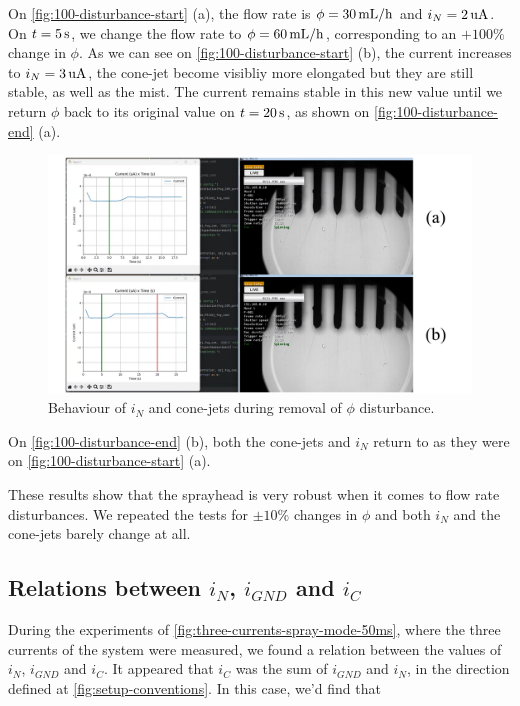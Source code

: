 \documentclass[oneside,12pt]{article}
\begin{document}
On \autoref{fig:100-disturbance-start} (a), the flow rate is $\phi = 30 \,\mathrm{mL/h}$ and $i_N = 2 \,\mathrm{uA}$. On $t = 5 \,\mathrm{s}$, 
we change the flow rate to $\phi = 60 \,\mathrm{mL/h}$, corresponding to an $+ 100\%$ change in $\phi$. As we can see on 
\autoref{fig:100-disturbance-start} (b), the current increases to $i_N = 3 \,\mathrm{uA}$, the cone-jet become visibliy more elongated 
but they are still stable, as well as the mist. The current remains stable in this new value until we return $\phi$ back to its
original value on $t = 20 \,\mathrm{s}$, as shown on \autoref{fig:100-disturbance-end} (a).

\begin{figure}[h!]
    \centering
    \includegraphics[width=\textwidth,trim=1 1 1 1,clip]{figures/100-disturbance-end.png}
    \caption{Behaviour of $i_N$ and cone-jets during removal of $\phi$ disturbance.}
    \label{fig:100-disturbance-end}
\end{figure}

On \autoref{fig:100-disturbance-end} (b), both the cone-jets and $i_N$ return to as they were on \autoref{fig:100-disturbance-start} (a).

These results show that the sprayhead is very robust when it comes to flow rate disturbances. We repeated the tests for $\pm 10 \%$ changes
in $\phi$ and both $i_N$ and the cone-jets barely change at all.

\subsection{Relations between $i_N$, $i_{GND}$ and $i_C$}

During the experiments of \autoref{fig:three-currents-spray-mode-50ms}, where the three currents of the system
were measured, we found a relation between the values of
$i_N$, $i_{GND}$ and $i_C$. It appeared that $i_C$ was the sum of $i_{GND}$ and $i_N$, in the direction defined at
\autoref{fig:setup-conventions}. In this case, we'd find that
\end{document}
